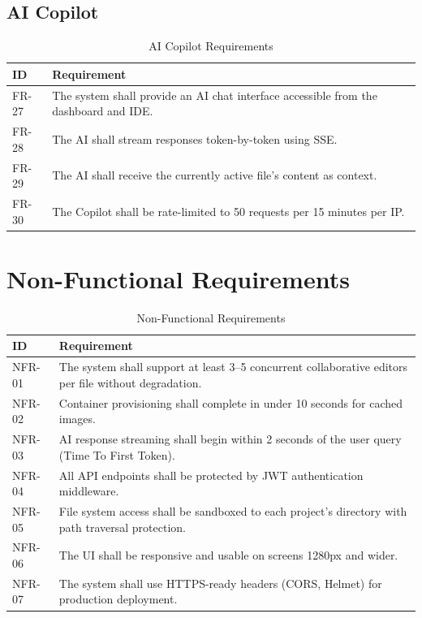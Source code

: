 \documentclass[12pt,a4paper,oneside]{report}
\begin{document}
\subsection{AI Copilot}

\begin{table}[H]
\centering
\caption{AI Copilot Requirements}
\label{tab:ai-req}
\begin{tabularx}{\textwidth}{lX}
\toprule
\textbf{ID} & \textbf{Requirement} \\
\midrule
FR-27 & The system shall provide an AI chat interface accessible from the dashboard and IDE. \\
FR-28 & The AI shall stream responses token-by-token using SSE. \\
FR-29 & The AI shall receive the currently active file's content as context. \\
FR-30 & The Copilot shall be rate-limited to 50 requests per 15 minutes per IP. \\
\bottomrule
\end{tabularx}
\end{table}

\section{Non-Functional Requirements}

\begin{table}[H]
\centering
\caption{Non-Functional Requirements}
\label{tab:nfr}
\begin{tabularx}{\textwidth}{lX}
\toprule
\textbf{ID} & \textbf{Requirement} \\
\midrule
NFR-01 & The system shall support at least 3--5 concurrent collaborative editors per file without degradation. \\
NFR-02 & Container provisioning shall complete in under 10 seconds for cached images. \\
NFR-03 & AI response streaming shall begin within 2 seconds of the user query (Time To First Token). \\
NFR-04 & All API endpoints shall be protected by JWT authentication middleware. \\
NFR-05 & File system access shall be sandboxed to each project's directory with path traversal protection. \\
NFR-06 & The UI shall be responsive and usable on screens 1280px and wider. \\
NFR-07 & The system shall use HTTPS-ready headers (CORS, Helmet) for production deployment. \\
\bottomrule
\end{tabularx}
\end{table}
\end{document}
